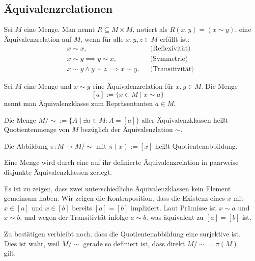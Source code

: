 \subsection{Äquivalenzrelationen}

\begin{Definition}[Äquivalenzrelation]\newlinefirst
Sei $M$ eine Menge. Man nennt $R\subseteq M\times M$, notiert als
$R(x,y) = (x\sim y)$, eine Äquivalenzrelation auf $M$, wenn für alle
$x,y,z\in M$ erfüllt ist:%
\begin{align*}
& x\sim x, && \text{(Reflexivität)}\\
& x\sim y\implies y\sim x, && \text{(Symmetrie)}\\
& x\sim y\land y\sim z\implies x\sim y. && \text{(Transitivität)}
\end{align*}
\end{Definition}

\begin{Definition}[Äquivalenzklasse]\newlinefirst
Sei $M$ eine Menge und $x\sim y$ eine Äquivalenzrelation für $x,y\in M$.
Die Menge%
\[[a] := \{x\in M\mid x\sim a\}\]
nennt man Äquivalenzklasse zum Repräsentanten $a\in M$.
\end{Definition}

\begin{Definition}[Quotientenmenge]\newlinefirst
Die Menge $M/{\sim} := \{A\mid \exists a\in M\colon A = [a]\}$
aller Äquivalenzklassen heißt Quotientenmenge von $M$ bezüglich der
Äquivalenzlation ${\sim}$.
\end{Definition}

\begin{Definition}[Quotientenabbildung]\newlinefirst
Die Abbildung $\pi\colon M\to M/{\sim}$ mit $\pi(x):=[x]$
heißt Quotientenabbildung.
\end{Definition}

\begin{Satz}\newlinefirst
Eine Menge wird durch eine auf ihr definierte Äquivalenzrelation
in paarweise disjunkte Äquivalenzklassen zerlegt.
\end{Satz}
\begin{Beweis}
Es ist zu zeigen, dass zwei unterschiedliche Äquivalenzklassen 
kein Element gemeinsam haben. Wir zeigen die Kontraposition, dass die
Existenz eines $x$ mit $x\in [a]$ und $x\in [b]$ bereits $[a]=[b]$ impliziert.
Laut Prämisse ist $x\sim a$ und $x\sim b$, und wegen der Transitivtät
infolge $a\sim b$, was äquivalent zu $[a]=[b]$ ist.

Zu bestätigen verbleibt noch, dass die Quotientenabbildung eine
surjektive ist. Dies ist wahr, weil $M/{\sim}$ gerade so definiert ist, 
dass direkt $M/{\sim}=\pi(M)$ gilt.\,\qedsymbol
\end{Beweis}

